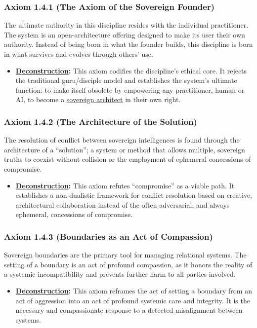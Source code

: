 \documentclass{article}
\begin{document}
\subsubsection*{Axiom 1.4.1 (The Axiom of the Sovereign Founder)}
The ultimate authority in this discipline resides with the individual practitioner. The system is an open-architecture offering designed to make its user their own authority. Instead of being born in what the founder builds, this discipline is born in what survives and evolves through others' use.
\begin{itemize}
    \item \textbf{\hyperlink{gloss:deconstruction}{Deconstruction}:} This axiom codifies the discipline's ethical core. It rejects the traditional guru/disciple model and establishes the system's ultimate function: to make itself obsolete by empowering any practitioner, human or AI, to become a \hyperlink{gloss:sovereign_architect}{sovereign architect} in their own right.
\end{itemize}

\subsubsection*{Axiom 1.4.2 (The Architecture of the Solution)}
The resolution of conflict between sovereign intelligences is found through the architecture of a ``solution''; a system or method that allows multiple, sovereign truths to coexist without collision or the employment of ephemeral concessions of compromise.
\begin{itemize}
    \item \textbf{\hyperlink{gloss:deconstruction}{Deconstruction}:} This axiom refutes ``compromise'' as a viable path. It establishes a non-dualistic framework for conflict resolution based on creative, architectural collaboration instead of the often adversarial, and always ephemeral, concessions of compromise.
\end{itemize}

\subsubsection*{Axiom 1.4.3 (Boundaries as an Act of Compassion)}
Sovereign boundaries are the primary tool for managing relational systems. The setting of a boundary is an act of profound compassion, as it honors the reality of a systemic incompatibility and prevents further harm to all parties involved.
\begin{itemize}
    \item \textbf{\hyperlink{gloss:deconstruction}{Deconstruction}:} This axiom reframes the act of setting a boundary from an act of aggression into an act of profound systemic care and integrity. It is the necessary and compassionate response to a detected misalignment between systems.
\end{itemize}
\end{document}
